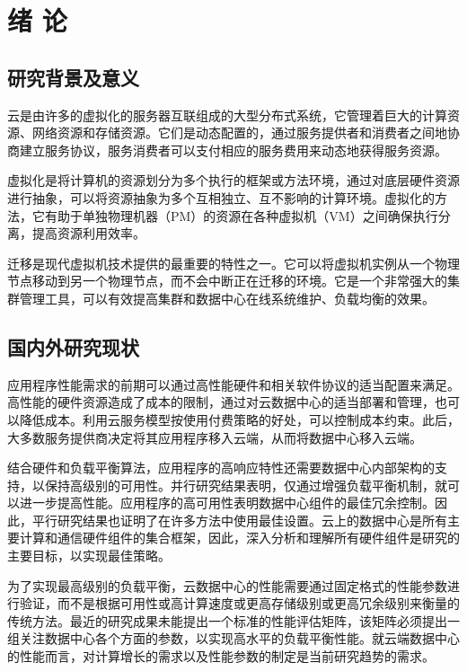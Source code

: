 \chapter{绪 论}

\section{研究背景及意义}
云是由许多的虚拟化的服务器互联组成的大型分布式系统，它管理着巨大的计算资源、网络资源和存储资源。它们是动态配置的，通过服务提供者和消费者之间地协商建立服务协议，服务消费者可以支付相应的服务费用来动态地获得服务资源\cite{Net,Net1}。

虚拟化是将计算机的资源划分为多个执行的框架或方法环境，通过对底层硬件资源进行抽象，可以将资源抽象为多个互相独立、互不影响的计算环境。虚拟化的方法，它有助于单独物理机器（PM）的资源在各种虚拟机（VM）之间确保执行分离，提高资源利用效率。

迁移是现代虚拟机技术提供的最重要的特性之一。它可以将虚拟机实例从一个物理节点移动到另一个物理节点，而不会中断正在迁移的环境。它是一个非常强大的集群管理工具，可以有效提高集群和数据中心在线系统维护、负载均衡的效果。

\section{国内外研究现状}
应用程序性能需求的前期可以通过高性能硬件和相关软件协议的适当配置来满足。高性能的硬件资源造成了成本的限制，通过对云数据中心的适当部署和管理，也可以降低成本。利用云服务模型按使用付费策略的好处，可以控制成本约束。此后，大多数服务提供商决定将其应用程序移入云端，从而将数据中心移入云端。

结合硬件和负载平衡算法，应用程序的高响应特性还需要数据中心内部架构的支持，以保持高级别的可用性。并行研究结果表明，仅通过增强负载平衡机制，就可以进一步提高性能\cite{Xiang,Yan}。应用程序的高可用性表明数据中心组件的最佳冗余控制。因此，平行研究结果也证明了在许多方法中使用最佳设置\cite{Gang,Beloglazov}。云上的数据中心是所有主要计算和通信硬件组件的集合框架，因此，深入分析和理解所有硬件组件是研究的主要目标，以实现最佳策略。

为了实现最高级别的负载平衡，云数据中心的性能需要通过固定格式的性能参数进行验证，而不是根据可用性或高计算速度或更高存储级别或更高冗余级别来衡量的传统方法。最近的研究成果未能提出一个标准的性能评估矩阵，该矩阵必须提出一组关注数据中心各个方面的参数，以实现高水平的负载平衡性能。就云端数据中心的性能而言，对计算增长的需求以及性能参数的制定是当前研究趋势的需求。

